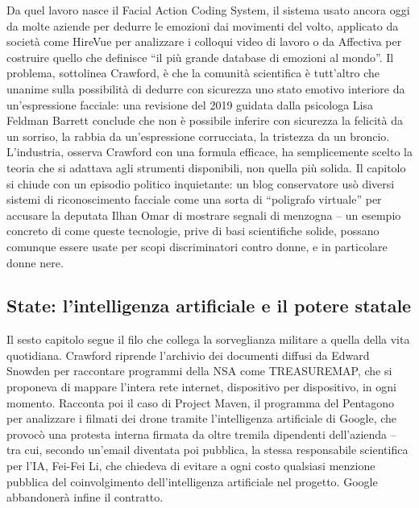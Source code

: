 \documentclass[a4paper,11pt]{article}
\begin{document}
Da quel lavoro nasce il Facial Action Coding System, il sistema usato ancora oggi da molte aziende per dedurre le emozioni dai movimenti del volto, applicato da società come HireVue per analizzare i colloqui video di lavoro o da Affectiva per costruire quello che definisce ``il più grande database di emozioni al mondo''. Il problema, sottolinea Crawford, è che la comunità scientifica è tutt'altro che unanime sulla possibilità di dedurre con sicurezza uno stato emotivo interiore da un'espressione facciale: una revisione del 2019 guidata dalla psicologa Lisa Feldman Barrett conclude che non è possibile inferire con sicurezza la felicità da un sorriso, la rabbia da un'espressione corrucciata, la tristezza da un broncio. L'industria, osserva Crawford con una formula efficace, ha semplicemente scelto la teoria che si adattava agli strumenti disponibili, non quella più solida. Il capitolo si chiude con un episodio politico inquietante: un blog conservatore usò diversi sistemi di riconoscimento facciale come una sorta di ``poligrafo virtuale'' per accusare la deputata Ilhan Omar di mostrare segnali di menzogna -- un esempio concreto di come queste tecnologie, prive di basi scientifiche solide, possano comunque essere usate per scopi discriminatori contro donne, e in particolare donne nere.

\subsection{State: l'intelligenza artificiale e il potere statale}

Il sesto capitolo segue il filo che collega la sorveglianza militare a quella della vita quotidiana. Crawford riprende l'archivio dei documenti diffusi da Edward Snowden per raccontare programmi della NSA come TREASUREMAP, che si proponeva di mappare l'intera rete internet, dispositivo per dispositivo, in ogni momento. Racconta poi il caso di Project Maven, il programma del Pentagono per analizzare i filmati dei drone tramite l'intelligenza artificiale di Google, che provocò una protesta interna firmata da oltre tremila dipendenti dell'azienda -- tra cui, secondo un'email diventata poi pubblica, la stessa responsabile scientifica per l'IA, Fei-Fei Li, che chiedeva di evitare a ogni costo qualsiasi menzione pubblica del coinvolgimento dell'intelligenza artificiale nel progetto. Google abbandonerà infine il contratto.
\end{document}

